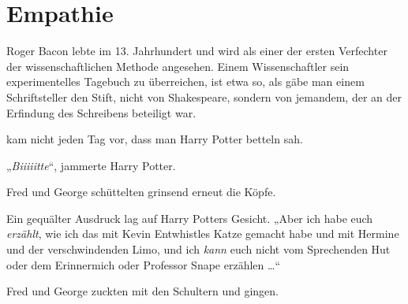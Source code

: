\chapter{Empathie}

\begin{chapterOpeningAuthorNote}
%
Roger Bacon lebte im 13. Jahrhundert und wird als einer der ersten Verfechter der wissenschaftlichen Methode angesehen. Einem Wissenschaftler sein experimentelles Tagebuch zu überreichen, ist etwa so, als gäbe man einem Schriftsteller den Stift, nicht von Shakespeare, sondern von jemandem, der an der Erfindung des Schreibens beteiligt war.
\end{chapterOpeningAuthorNote}

 kam nicht jeden Tag vor, dass man Harry Potter betteln sah.

\hplettrineextrapara
„\emph{Biiiiitte}“, jammerte Harry Potter.

Fred und George schüttelten grinsend erneut die Köpfe.

Ein gequälter Ausdruck lag auf Harry Potters Gesicht.
„Aber ich habe euch \emph{erzählt}, wie ich das mit Kevin Entwhistles Katze gemacht habe und mit Hermine und der verschwindenden Limo, und ich \emph{kann} euch nicht vom Sprechenden Hut oder dem Erinnermich oder Professor Snape erzählen …“

Fred und George zuckten mit den Schultern und gingen.

